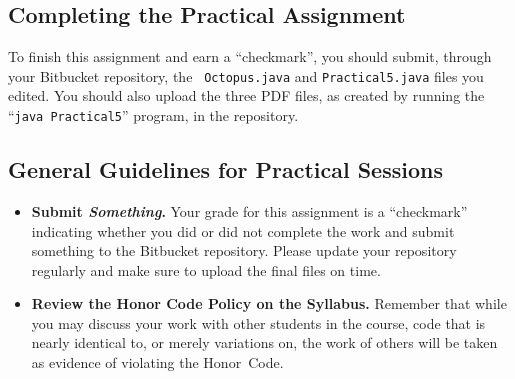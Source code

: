 \vspace*{-.3in}
\subsection*{Completing the Practical Assignment}
\vspace*{-.1in}

To finish this assignment and earn a ``checkmark'', you should submit, through your Bitbucket repository, the {\tt
  Octopus.java} and {\tt Practical5.java} files you edited. You should also upload the three PDF files, as created by
running the ``{\tt java Practical5}'' program, in the repository.

\vspace*{-.15in}
\subsection*{General Guidelines for Practical Sessions}
\vspace*{-.05in}
\begin{itemize}

\item {\bf Submit \textbf{\textit{Something}}.} Your grade for this assignment is a ``checkmark'' indicating whether you
  did or did not complete the work and submit something to the Bitbucket repository. Please update your repository
  regularly and make sure to upload the final files on time.


\item {\bf Review the Honor Code Policy on the Syllabus.} Remember that while you may discuss your work with other
  students in the course, code that is nearly identical to, or merely variations on, the work of others will be
  taken as evidence of violating the \mbox{Honor Code}.
\end{itemize}




